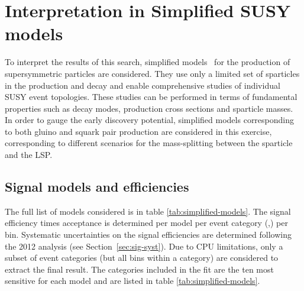 \section{Interpretation in Simplified SUSY models}
\label{sec:susy}
To interpret the results of this search, simplified
models~\cite{Alwall:2008ag,Alwall:2008va,sms} for the production of supersymmetric particles are considered. 
They use only a limited set of sparticles in the production and
decay and enable comprehensive studies of individual SUSY event
topologies. These studies can be performed in terms of
fundamental properties such as decay modes, production cross sections and sparticle masses. 
In order to gauge the early discovery potential, simplified models corresponding to both gluino and squark pair production 
are considered in this exercise, corresponding to different scenarios for the mass-splitting between the sparticle and the LSP. 

\subsection{Signal models and efficiencies}
\label{subsec:susy_models}

The full list of models considered is in table \ref{tab:simplified-models}. 
The signal efficiency times acceptance is determined per model per event
category (\njet,\nb) per \HT bin. 
Systematic uncertainties on the signal efficiencies are determined 
following the 2012 analysis (see Section~\ref{sec:sig-syst}). Due to CPU
limitations, only a subset of event categories (but all \scalht bins
within a category) are considered to extract the final result. 
The categories included in the fit are the ten most sensitive 
for each model and are listed in table \ref{tab:simplified-models}. 

